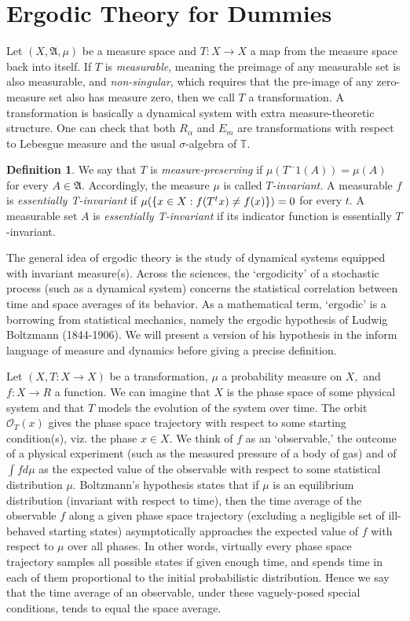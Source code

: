 \documentclass[12pt, letterpaper, oneside]{book}
\newcommand{\ga}{\ensuremath{\alpha}}
\newcommand{\gs}{\ensuremath{\sigma}}
\newcommand{\T}{\mathbb{T}}
\DeclarePairedDelimiter{\set}{\lbrace}{\rbrace}
\theoremstyle{plain}
\theoremstyle{definition}
\newtheorem{definition}{Definition}
\theoremstyle{remark}
\begin{document}
\section{Ergodic Theory for Dummies}
Let $(X,\mathfrak{A}, \mu)$ be a measure space and $T:X\to X$ a map from the measure space back into itself. If $T$ is \textit{measurable}, meaning the preimage of any measurable set is also measurable, and \textit{non-singular}, which requires that the pre-image of any zero-measure set also has measure zero, then we call $T$ a transformation. A transformation is basically a dynamical system with extra measure-theoretic structure.  One can check that both $R_\ga$ and $E_m$ are transformations with respect to Lebesgue measure and the usual $\gs$-algebra of $\T.$ 


\begin{definition}
We say that $T$ is \textit{measure-preserving} if $\mu(T^-1(A)) = \mu(A)$ for every $A \in \mathfrak{A}.$ Accordingly, the measure $\mu$ is called $T$\textit{-invariant.} A measurable $f$ is \textit{essentially T-invariant} if $\mu(\set{x \in X: f(T^tx) \neq f(x)}) = 0$ for every $t.$  A measurable set $A$ is \textit{essentially T-invariant} if its indicator function is essentially $T$-invariant. 
\end{definition}

The general idea of ergodic theory is the study of dynamical systems equipped with invariant measure(s). Across the sciences, the `ergodicity' of a stochastic process (such as a dynamical system) concerns the statistical correlation between time and space averages of its behavior. As a mathematical term, `ergodic'  is a borrowing from statistical mechanics, namely the ergodic hypothesis of Ludwig Boltzmann (1844-1906). We will present a version of his hypothesis in the inform language of measure and dynamics before giving a precise definition.

 Let $(X,T:X\to X)$ be a transformation, $\mu$ a probability measure on $X,$ and $f:X\to R$ a function. We can imagine that $X$ is the phase space of some physical system and that $T$ models the evolution of the system over time. The orbit $\mathcal{O}_T(x)$ gives the phase space trajectory with respect to some starting condition(s), viz. the phase $x \in X.$ We think of $f$ as an `observable,' the outcome of a physical experiment (such as the measured pressure of a body of gas) and of  $\int f d\mu$ as the expected value of the observable with respect to some statistical distribution $\mu.$ Boltzmann's hypothesis states that if $\mu$ is an equilibrium distribution (invariant with respect to time), then the time average of the observable $f$ along a given phase space trajectory (excluding a negligible set of ill-behaved starting states) asymptotically approaches the expected value of $f$ with respect to $\mu$ over all phases. In other words, virtually every phase space trajectory samples all possible states if given enough time, and spends time in each of them proportional to the initial probabilistic distribution. Hence we say that the time average of an observable, under these vaguely-posed special conditions, tends to equal the space average. 
\end{document}
